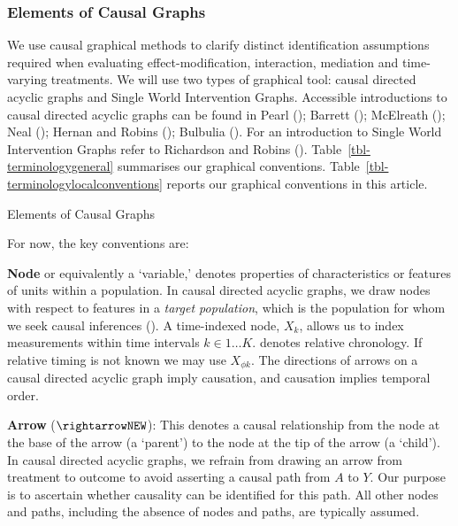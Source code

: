 \documentclass[
  single column]{article}
\begin{document}
\subsubsection{Elements of Causal
Graphs}\label{elements-of-causal-graphs}

We use causal graphical methods to clarify distinct identification
assumptions required when evaluating effect-modification, interaction,
mediation and time-varying treatments. We will use two types of
graphical tool: causal directed acyclic graphs and Single World
Intervention Graphs. Accessible introductions to causal directed acyclic
graphs can be found in Pearl (); Barrett
(); McElreath
(); Neal
(); Hernan and Robins
(); Bulbulia
(). For an introduction to Single World
Intervention Graphs refer to Richardson and Robins
().
Table~\ref{tbl-terminologygeneral} summarises our graphical conventions.
Table~\ref{tbl-terminologylocalconventions} reports our graphical
conventions in this article.

\begin{table}

\caption{\label{tbl-terminologygeneral}Elements of Causal Graphs}

\centering{

\terminologygeneral

}

\end{table}%

For now, the key conventions are:

\textbf{Node} or equivalently a `variable,' denotes properties of
characteristics or features of units within a population. In causal
directed acyclic graphs, we draw nodes with respect to features in a
\emph{target population}, which is the population for whom we seek
causal inferences (). A time-indexed node, \(X_k\), allows us to index measurements
within time intervals \(k \in 1\dots K\). denotes relative chronology.
If relative timing is not known we may use \(X_{\phi k}\). The
directions of arrows on a causal directed acyclic graph imply causation,
and causation implies temporal order.

\textbf{Arrow} (\(\rightarrowNEW\)): This denotes a causal relationship
from the node at the base of the arrow (a `parent') to the node at the
tip of the arrow (a `child'). In causal directed acyclic graphs, we
refrain from drawing an arrow from treatment to outcome to avoid
asserting a causal path from \(A\) to \(Y\). Our purpose is to ascertain
whether causality can be identified for this path. All other nodes and
paths, including the absence of nodes and paths, are typically assumed.
\end{document}
